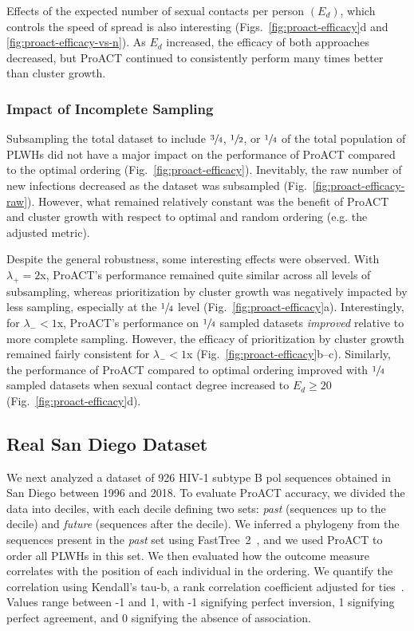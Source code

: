 Effects of the expected number of sexual contacts per person $\left(E_d\right)$, which controls the speed of spread is also interesting (Figs.~\ref{fig:proact-efficacy}d and \ref{fig:proact-efficacy-vs-n}). As $E_d$ increased, the efficacy of both approaches decreased, but ProACT continued to consistently perform many times better than cluster growth.

\subsubsection{Impact of Incomplete Sampling}
Subsampling the total dataset to include $\sfrac{3}{4}$, $\sfrac{1}{2}$, or $\sfrac{1}{4}$ of the total population of \glspl{PLWH} did not have a major impact on the performance of ProACT compared to the optimal ordering (Fig.~\ref{fig:proact-efficacy}). Inevitably, the raw number of new infections decreased as the dataset was subsampled (Fig.~\ref{fig:proact-efficacy-raw}).  However, what remained relatively constant was the benefit of ProACT and cluster growth with respect to optimal and random ordering (e.g. the adjusted metric).

Despite the general robustness, some interesting effects were observed. With $\lambda_{+}=2$x, ProACT's performance remained quite similar across all levels of subsampling, whereas prioritization by cluster growth was negatively impacted by less sampling, especially at the $\sfrac{1}{4}$ level (Fig.~\ref{fig:proact-efficacy}a). Interestingly, for  $\lambda_{-}<1$x, ProACT's performance on  $\sfrac{1}{4}$ sampled datasets \textit{improved} relative to more complete sampling. However, the efficacy of prioritization by cluster growth remained fairly consistent  for  $\lambda_{-}<1$x (Fig.~\ref{fig:proact-efficacy}b--c). Similarly, the performance of ProACT compared to optimal ordering improved with $\sfrac{1}{4}$ sampled datasets when sexual contact degree increased to $E_d\geq 20$ (Fig.~\ref{fig:proact-efficacy}d).

\subsection{Real San Diego Dataset}
We next analyzed a dataset of 926 \gls{HIV}-1 subtype B \gls{pol} sequences obtained in San Diego between 1996 and 2018. To evaluate ProACT accuracy, we divided the data into deciles, with each decile defining two sets: \textit{past} (sequences up to the decile) and \textit{future} (sequences after the decile). We inferred a phylogeny from the sequences present in the \textit{past} set using FastTree~2~\cite{Price2010}, and we used ProACT to order all \glspl{PLWH} in this set. We then evaluated how the outcome measure correlates with the position of each individual in the ordering. We quantify the correlation using Kendall's tau-b, a rank correlation coefficient adjusted for ties~\cite{Kendall1938}. Values range between -1 and 1, with -1 signifying perfect inversion, 1 signifying perfect agreement, and 0 signifying the absence of association.

